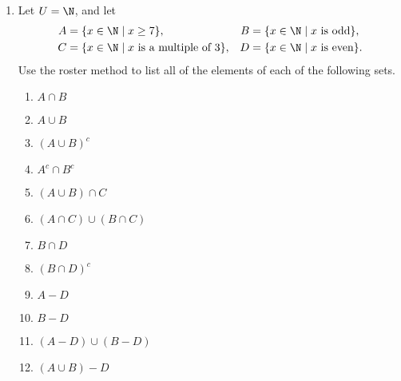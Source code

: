 \begin{enumerate}
\item Let  $U = \N$, and let
\label{exer:sec41-6x}%
%
\begin{align} \notag
A &= \left\{ x \in \N \mid x \geq 7 \right\}\!,  &  B &= \left\{ x \in \N \mid x \text{ is odd} \right\}\!, \\ \notag
C &= \left\{ x \in \N \mid x \text{ is a multiple of 3} \right\}\!,      &  
D &= \left\{ x \in \N \mid x \text{ is even} \right\}\!.  \notag
\notag
\end{align}
Use the roster method to list all of the elements of each of the following sets.
%
\begin{multicols}{2}
\begin{enumerate}
  \item $A \cap B$
  \item $A \cup B$
  \item $\left( {A \cup B} \right)^c $
  \item $A^c  \cap B^c $
  \item $\left( {A \cup B} \right) \cap C$
  \item $\left( {A \cap C} \right) \cup \left( {B \cap C} \right)$
  \item $B \cap D$
  \item $\left( {B \cap D} \right)^c $
  \item $A - D$
  \item $B - D$
  \item $\left( {A - D} \right) \cup \left( {B - D} \right)$
  \item $\left( {A \cup B} \right) - D$
\end{enumerate}
\end{multicols}


\end{enumerate}
